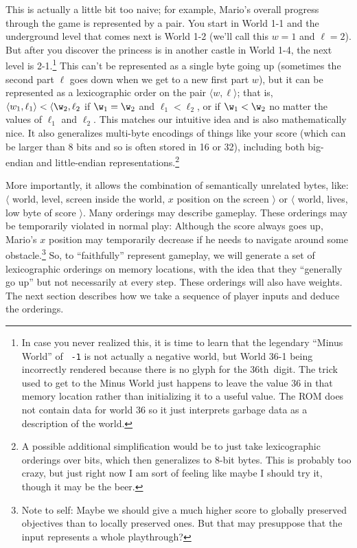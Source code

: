 \documentclass[twocolumn]{article}
\newcommand\th{th}
\begin{document}
This is actually a little bit too naive; for example, Mario's overall progress through the game is represented by a pair. You start in World 1-1 and the underground level that comes next is World 1-2 (we'll call this $w=1$ and $\ell=2$). But after you discover the princess is in another castle in World 1-4, the next level is 2-1.\footnote{In case you never realized this, it is time to learn that the legendary ``Minus World'' of \verb+ -1+ is not actually a negative world, but World 36-1 being incorrectly rendered because there is no glyph for the 36\th\ digit. The trick used to get to the Minus World just happens to leave the value 36 in that memory location rather than initializing it to a useful value. The ROM does not contain data for world 36 so it just interprets garbage data as a description of the world.} This can't be represented as a single byte going up (sometimes the second part $\ell$ goes down when we get to a new first part $w$), but it can be represented as a lexicographic order on the pair $\langle w, \ell \rangle$; that is, $\langle w_1, \ell_1 \rangle < \langle \w_2, \ell_2$ if $\w_1 = \w_2$ and $\ell_1 < \ell_2$, or if $\w_1 < \w_2$ no matter the values of $\ell_1$ and $\ell_2$. This matches our intuitive idea and is also mathematically nice. It also generalizes multi-byte encodings of things like your score (which can be larger than 8 bits and so is often stored in 16 or 32), including both big-endian and little-endian representations.\footnote{A possible additional simplification would be to just take lexicographic orderings over bits, which then generalizes to 8-bit bytes. This is probably too crazy, but just right now I am sort of feeling like maybe I should try it, though it may be the beer.}

More importantly, it allows the combination of semantically unrelated bytes, like: $\langle$ world, level, screen inside the world, $x$ position on the screen $\rangle$ or $\langle$ world, lives, low byte of score $\rangle$. Many orderings may describe gameplay. These orderings may be temporarily violated in normal play: Although the score always goes up, Mario's $x$ position may temporarily decrease if he needs to navigate around some obstacle.\footnote{Note to self: Maybe we should give a much higher score to globally preserved objectives than to locally preserved ones. But that may presuppose that the input represents a whole playthrough?} So, to ``faithfully'' represent gameplay, we will generate a set of lexicographic orderings on memory locations, with the idea that they ``generally go up'' but not necessarily at every step. These orderings will also have weights. The next section describes how we take a sequence of player inputs and deduce the orderings.
\end{document}

